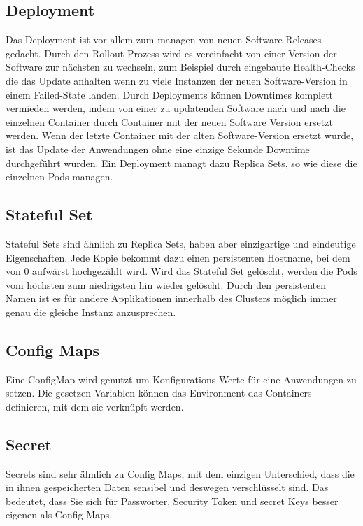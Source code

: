 \subsection{Deployment}
Das Deployment ist vor allem zum managen von neuen Software Releases gedacht. 
Durch den Rollout-Prozess wird es vereinfacht von einer Version der Software zur nächsten zu wechseln, zum Beispiel durch eingebaute Health-Checks die das Update anhalten wenn zu viele Instanzen der neuen Software-Version in einem Failed-State landen.
Durch Deployments können Downtimes komplett vermieden werden, indem von einer zu updatenden Software nach und nach die einzelnen Container durch Container mit der neuen Software Version ersetzt werden.
Wenn der letzte Container mit der alten Software-Version ersetzt wurde, ist das Update der Anwendungen ohne eine einzige Sekunde Downtime durchgeführt wurden.
Ein Deployment managt dazu Replica Sets, so wie diese die einzelnen Pods managen.
\cite[S.113 ff.]{Kubernetes_up_and_running}

\subsection{Stateful Set}
Stateful Sets sind ähnlich zu Replica Sets, haben aber einzigartige und eindeutige Eigenschaften.
Jede Kopie bekommt dazu einen persistenten Hostname, bei dem von 0 aufwärst hochgezählt wird. 
Wird das Stateful Set gelöscht, werden die Pods vom höchsten zum niedrigsten hin wieder gelöscht.
Durch den persistenten Namen ist es für andere Applikationen innerhalb des Clusters möglich immer genau die gleiche Instanz anzusprechen.
\cite[S.186 f.]{Kubernetes_up_and_running}

\subsection{Config Maps}
Eine ConfigMap wird genutzt um Konfigurations-Werte für eine Anwendungen zu setzen. 
Die gesetzen Variablen können das Environment das Containers definieren, mit dem sie verknüpft werden.
\cite[S.153]{Kubernetes_up_and_running}

\subsection{Secret}
Secrets sind sehr ähnlich zu Config Maps, mit dem einzigen Unterschied, dass die in ihnen gespeicherten Daten sensibel und deswegen verschlüsselt sind.
Das bedeutet, dass Sie sich für Passwörter, Security Token und secret Keys besser eigenen als Config Maps.
\cite[S.157 f.]{Kubernetes_up_and_running}

